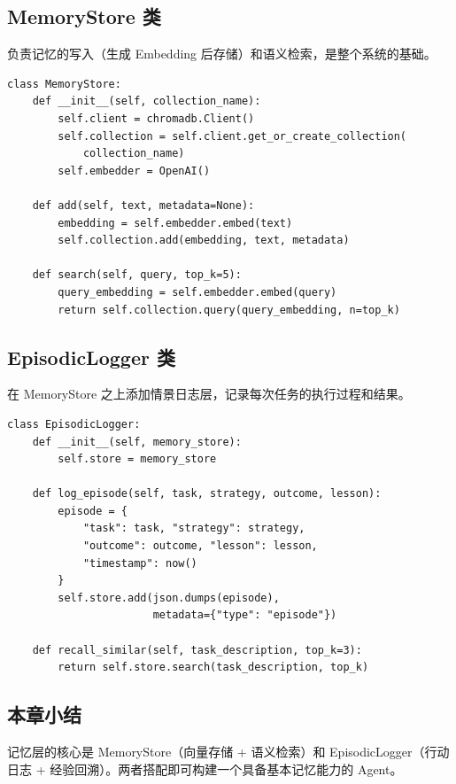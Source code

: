 \documentclass[a4paper]{article}
\begin{document}
\subsection{MemoryStore 类}

负责记忆的写入（生成 Embedding 后存储）和语义检索，是整个系统的基础。

\begin{lstlisting}[caption={MemoryStore 核心接口（伪代码）}]
class MemoryStore:
    def __init__(self, collection_name):
        self.client = chromadb.Client()
        self.collection = self.client.get_or_create_collection(
            collection_name)
        self.embedder = OpenAI()

    def add(self, text, metadata=None):
        embedding = self.embedder.embed(text)
        self.collection.add(embedding, text, metadata)

    def search(self, query, top_k=5):
        query_embedding = self.embedder.embed(query)
        return self.collection.query(query_embedding, n=top_k)
\end{lstlisting}

\subsection{EpisodicLogger 类}

在 MemoryStore 之上添加情景日志层，记录每次任务的执行过程和结果。

\begin{lstlisting}[caption={EpisodicLogger 核心接口（伪代码）}]
class EpisodicLogger:
    def __init__(self, memory_store):
        self.store = memory_store

    def log_episode(self, task, strategy, outcome, lesson):
        episode = {
            "task": task, "strategy": strategy,
            "outcome": outcome, "lesson": lesson,
            "timestamp": now()
        }
        self.store.add(json.dumps(episode),
                       metadata={"type": "episode"})

    def recall_similar(self, task_description, top_k=3):
        return self.store.search(task_description, top_k)
\end{lstlisting}

\subsection{本章小结}

记忆层的核心是 MemoryStore（向量存储 + 语义检索）和 EpisodicLogger（行动日志 + 经验回溯）。两者搭配即可构建一个具备基本记忆能力的 Agent。
\end{document}
